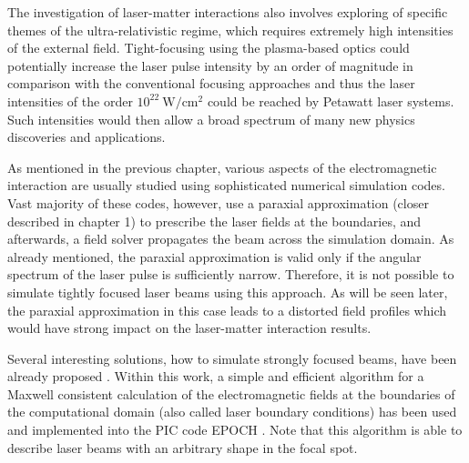 The investigation of laser-matter interactions also involves exploring of specific themes of the ultra-relativistic regime, which requires extremely high intensities of the external field. Tight-focusing using the plasma-based optics could potentially increase the laser pulse intensity by an order of magnitude in comparison with the conventional focusing approaches and thus the laser intensities of the order $ 10^{22} \ \mathrm{W/cm^2} $ could be reached by Petawatt laser systems. Such intensities would then allow a broad spectrum of many new physics discoveries and applications.

As mentioned in the previous chapter, various aspects of the electromagnetic interaction are usually studied using sophisticated numerical simulation codes. Vast majority of these codes, however, use a paraxial approximation (closer described in chapter 1) to prescribe the laser fields at the boundaries, and afterwards, a field solver propagates the beam across the simulation domain. As already mentioned, the paraxial approximation is valid only if the angular spectrum of the laser pulse is sufficiently narrow. Therefore, it is not possible to simulate tightly focused laser beams using this approach. As will be seen later, the paraxial approximation in this case leads to a distorted field profiles which would have strong impact on the laser-matter interaction results.

Several interesting solutions, how to simulate strongly focused beams, have been already proposed \cite{Sepke2006, Fedorov2016, Wang2002, Sepke22006, Agrawal1979, Hua2004, Hora1990, Couairon2015, Moloney2012, Sheppard1999}. Within this work, a simple and efficient algorithm for a Maxwell consistent calculation of the electromagnetic fields at the boundaries of the computational domain \cite{Thiele2016} (also called laser boundary conditions) has been used and implemented into the PIC code EPOCH \cite{bennett}. Note that this algorithm is able to describe laser beams with an arbitrary shape in the focal spot.
